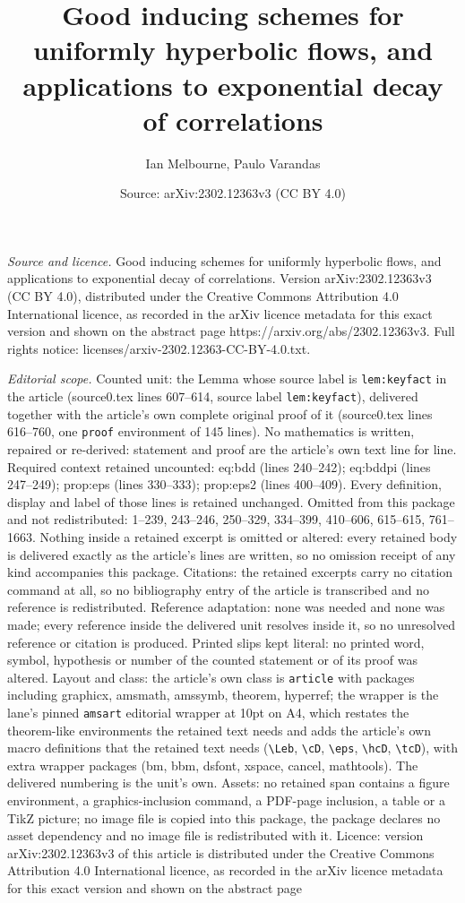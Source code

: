 \documentclass[10pt,a4paper]{amsart}
\title[Good inducing schemes for uniformly hyperbolic flows, and ap]{Good inducing schemes for uniformly hyperbolic flows, and applications to exponential decay of correlations}
\author{Ian Melbourne, Paulo Varandas}
\date{Source: arXiv:2302.12363v3 (CC BY 4.0)}
\begin{document}
\maketitle

\noindent\emph{Source and licence.} Good inducing schemes for uniformly hyperbolic flows, and applications to exponential decay of correlations. Version arXiv:2302.12363v3 (CC BY 4.0), distributed under the Creative Commons Attribution 4.0 International licence, as recorded in the arXiv licence metadata for this exact version and shown on the abstract page https://arxiv.org/abs/2302.12363v3. Full rights notice: licenses/arxiv-2302.12363-CC-BY-4.0.txt.\par\smallskip

\noindent\textit{Editorial scope.} Counted unit: the Lemma whose source label is \texttt{lem:keyfact} in the article (source0.tex lines 607--614, source label \texttt{lem:keyfact}), delivered together with the article's own complete original proof of it (source0.tex lines 616--760, one \texttt{proof} environment of 145 lines). No mathematics is written, repaired or re-derived: statement and proof are the article's own text line for line. Required context retained uncounted: eq:bdd (lines 240--242); eq:bddpi (lines 247--249); prop:eps (lines 330--333); prop:eps2 (lines 400--409). Every definition, display and label of those lines is retained unchanged. Omitted from this package and not redistributed: 1--239, 243--246, 250--329, 334--399, 410--606, 615--615, 761--1663. Nothing inside a retained excerpt is omitted or altered: every retained body is delivered exactly as the article's lines are written, so no omission receipt of any kind accompanies this package. Citations: the retained excerpts carry no citation command at all, so no bibliography entry of the article is transcribed and no reference is redistributed. Reference adaptation: none was needed and none was made; every reference inside the delivered unit resolves inside it, so no unresolved reference or citation is produced. Printed slips kept literal: no printed word, symbol, hypothesis or number of the counted statement or of its proof was altered. Layout and class: the article's own class is \texttt{article} with packages including graphicx, amsmath, amssymb, theorem, hyperref; the wrapper is the lane's pinned \texttt{amsart} editorial wrapper at 10pt on A4, which restates the theorem-like environments the retained text needs and adds the article's own macro definitions that the retained text needs (\texttt{\textbackslash Leb}, \texttt{\textbackslash cD}, \texttt{\textbackslash eps}, \texttt{\textbackslash hcD}, \texttt{\textbackslash tcD}), with extra wrapper packages (bm, bbm, dsfont, xspace, cancel, mathtools). The delivered numbering is the unit's own. Assets: no retained span contains a figure environment, a graphics-inclusion command, a PDF-page inclusion, a table or a TikZ picture; no image file is copied into this package, the package declares no asset dependency and no image file is redistributed with it. Licence: version arXiv:2302.12363v3 of this article is distributed under the Creative Commons Attribution 4.0 International licence, as recorded in the arXiv licence metadata for this exact version and shown on the abstract page 
\end{document}
